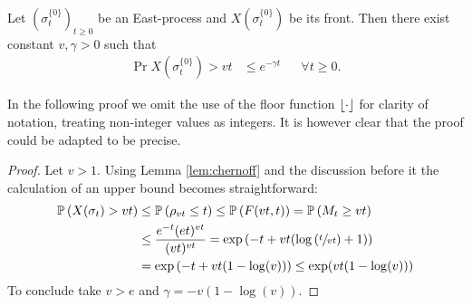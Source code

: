\begin{theorem}\label{thm:speed_upper_bound}
Let $(\sigma^{\{0\}}_t)_{t \geq 0}$ be an East-process and $X(\sigma^{\{0\}}_t)$ be its front. Then there exist constant $v, \gamma > 0$ such that 
\begin{align}
\Pr{X(\sigma^{\{0\}}_t) > vt} &\leq e^{- \gamma t} &&\forall t \geq 0. 
\end{align}
\end{theorem}

\begin{remark}
In the following proof we omit the use of the floor function $\lfloor\cdot\rfloor$ for clarity of notation, treating non-integer values as integers. It is however clear that the proof could be adapted to be precise. 
\end{remark}

\begin{proof}
Let $v > 1$. Using Lemma \ref{lem:chernoff} and the discussion before it the calculation of an upper bound becomes straightforward:
\begin{align*}
\mathbb{P} \left( X(\sigma_t) > vt \right) &\leq \mathbb{P} \left( \rho_{vt} \leq t \right) \leq \mathbb{P} \left( F(vt, t) \right) = \mathbb{P} \left( M_t \geq vt \right) \\
                      &\leq \frac{e^{-t}(e t)^{vt}}{(vt)^{vt}} = \exp\left( -t + vt(\log\left(\sfrac{t}{vt}\right) + 1)\right) \\
                      &= \exp\left( -t + vt (1 - \log(v))\right) \leq \exp(vt (1 - \log(v)))
\end{align*}
To conclude take $v > e$ and $\gamma = - v (1 - \log(v))$. 
\end{proof}




